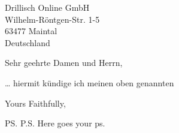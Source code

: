 \documentclass{letter}
\begin{document}
\begin{letter}{Drillisch Online GmbH \\ Wilhelm-R\"ontgen-Str. 1-5 \\ 63477 Maintal \\ Deutschland}
\opening{Sehr geehrte Damen und Herrn,}
\dots
hiermit k\"undige ich meinen oben genannten 
\closing{Yours Faithfully,}
\ps{P.S. Here goes your ps.}
\end{letter}
\end{document}
